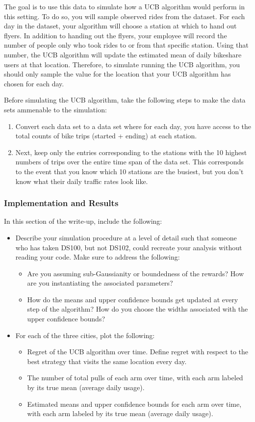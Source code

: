 \documentclass[12pt, answers, addpoints]{exam}
\begin{document}
The goal is to use this data to simulate how a UCB algorithm would perform in this setting. To do so, you will sample observed rides from the dataset. For each day in the dataset, your algorithm will choose a station at which to hand out flyers. In addition to handing out the flyers, your employee will record the number of people only who took rides to or from that specific station. Using that number, the UCB algorithm will update the estimated mean of daily bikeshare users at that location. Therefore, to simulate running the UCB algorithm, you should only sample the value for the location that your UCB algorithm has chosen for each day. 

Before simulating the UCB algorithm, take the following steps to make the data sets ammenable to the simulation:
\begin{enumerate}
    \item Convert each data set to a data set where for each day, you have access to the total counts of bike trips (started + ending) at each station. 
    \item Next, keep only the entries corresponding to the stations with the 10 highest numbers of trips over the entire time span of the data set. This corresponds to the event that you know which 10 stations are the busiest, but you don't know what their daily traffic rates look like.
\end{enumerate}

\subsubsection{Implementation and Results}
In this section of the write-up, include the following:
\begin{itemize}
    \item Describe your simulation procedure at a level of detail such that someone who has taken DS100, but not DS102, could recreate your analysis without reading your code. Make sure to address the following:
    \begin{itemize}
    \item{Are you assuming sub-Gaussianity or boundedness of the rewards? How are you instantiating the associated parameters?}
    \item{How do the means and upper confidence bounds get updated at every step of the algorithm? How do you choose the widths associated with the upper confidence bounds?}
    \end{itemize}
    \item For each of the three cities, plot the following:
        \begin{itemize}
        \item{Regret of the UCB algorithm over time. Define regret with respect to the best strategy that visits the same location every day.}
        \item{The number of total pulls of each arm over time, with each arm labeled by its true mean (average daily usage).}
        \item{Estimated means and upper confidence bounds for each arm over time, with each arm labeled by its true mean (average daily usage).}
        \end{itemize}
\end{itemize}
\end{document}
